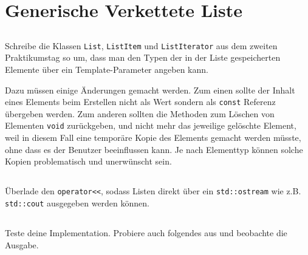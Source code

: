 \section{Generische Verkettete Liste}
\label{sec:list}
\subsection{}
Schreibe die Klassen \lstinline{List}, \lstinline{ListItem} und \lstinline{ListIterator} aus dem zweiten Praktikumstag so um, dass man den Typen der in der Liste gespeicherten Elemente über ein Template-Parameter angeben kann.

Dazu müssen einige Änderungen gemacht werden.
Zum einen sollte der Inhalt eines Elements beim Erstellen nicht als Wert sondern als \lstinline{const} Referenz übergeben werden.
Zum anderen sollten die Methoden zum Löschen von Elementen \lstinline{void} zurückgeben, und nicht mehr das jeweilige gelöschte Element, weil in diesem Fall eine temporäre Kopie des Elements gemacht werden müsste, ohne dass es der Benutzer beeinflussen kann.
Je nach Elementtyp können solche Kopien problematisch und unerwünscht sein.


\subsection{}
Überlade den \lstinline{operator<<}, sodass Listen direkt über ein \lstinline{std::ostream} wie z.B. \lstinline{std::cout} ausgegeben werden können.

\subsection{}
Teste deine Implementation. Probiere auch folgendes aus und beobachte die Ausgabe.


